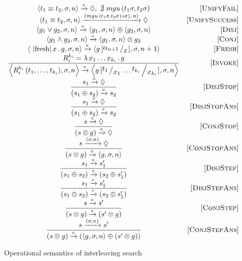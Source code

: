 \begin{figure*}
  \renewcommand{\arraystretch}{1.6}
  \[
  \begin{array}{cr}
    \inbr{t_1 \equiv t_2, \sigma, n} \xrightarrow{\step} \Diamond , \, \, \nexists\; mgu\,(t_1 \sigma, t_2 \sigma) &\ruleno{UnifyFail} \\
    \inbr{t_1 \equiv t_2, \sigma, n} \xrightarrow{(mgu\,(t_1 \sigma, t_2 \sigma) \circ \sigma),\, n)} \Diamond & \ruleno{UnifySuccess} \\
    \inbr{g_1 \lor g_2, \sigma, n} \xrightarrow{\step} \inbr{g_1, \sigma, n} \oplus \inbr{g_2, \sigma, n} & \ruleno{Disj} \\
    \inbr{g_1 \land g_2, \sigma, n} \xrightarrow{\step} \inbr{ g_1, \sigma, n} \otimes g_2 & \ruleno{Conj} \\
    \inbr{\mbox{\lstinline|fresh|}\, x\, .\, g, \sigma, n} \xrightarrow{\step} \inbr{g\,[\bigslant{\alpha_{n + 1}}{x}], \sigma, n + 1} & \ruleno{Fresh} \\
    \dfrac{R_i^{k_i}=\lambda\,x_1\dots x_{k_i}\,.\,g}{\inbr{R_i^{k_i}\,(t_1,\dots,t_{k_i}),\sigma,n} \xrightarrow{\step} \inbr{g\,[\bigslant{t_1}{x_1}\dots\bigslant{t_{k_i}}{x_{k_i}}], \sigma, n}} & \ruleno{Invoke}\\
    \dfrac{s_1 \xrightarrow{\step} \Diamond}{(s_1 \oplus s_2) \xrightarrow{\step} s_2} & \ruleno{DisjStop}\\
    \dfrac{s_1 \xrightarrow{r} \Diamond}{(s_1 \oplus s_2) \xrightarrow{r} s_2} & \ruleno{DisjStopAns}\\
    \dfrac{s \xrightarrow{\step} \Diamond}{(s \otimes g) \xrightarrow{\step} \Diamond} &\ruleno{ConjStop}\\
    \dfrac{s \xrightarrow{(\sigma, n)} \Diamond}{(s \otimes g) \xrightarrow{\step} \inbr{g, \sigma, n}}  & \ruleno{ConjStopAns}\\
    \dfrac{s_1 \xrightarrow{\step} s'_1}{(s_1 \oplus s_2) \xrightarrow{\step} (s_2 \oplus s'_1)} &\ruleno{DisjStep}\\
    \dfrac{s_1 \xrightarrow{r} s'_1}{(s_1 \oplus s_2) \xrightarrow{r} (s_2 \oplus s'_1)} &\ruleno{DisjStepAns}\\
    \dfrac{s \xrightarrow{\step} s'}{(s \otimes g) \xrightarrow{\step} (s' \otimes g)} &\ruleno{ConjStep}\\
    \dfrac{s \xrightarrow{(\sigma, n)} s'}{(s \otimes g) \xrightarrow{\step} (\inbr{g, \sigma, n} \oplus (s' \otimes g))} & \ruleno{ConjStepAns} 
  \end{array}
  \]
  \caption{Operational semantics of interleaving search}
  \label{lts}
\end{figure*}

